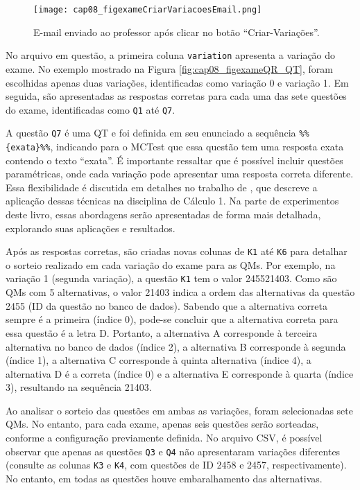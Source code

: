 \begin{figure}[!ht]
  \centering
  \texttt{[image: cap08\_figexameCriarVariacoesEmail.png]}
   \caption{E-mail enviado ao professor após clicar no botão ``Criar-Variações''.}
\label{fig:cap08_figexameCriarVariacoesEmail}
\end{figure}


No arquivo em questão, a primeira coluna \verb|variation| apresenta a variação do exame. No exemplo mostrado na Figura \ref{fig:cap08_figexameQR_QT}, foram escolhidas apenas duas variações, identificadas como variação 0 e variação 1. Em seguida, são apresentadas as respostas corretas para cada uma das sete questões do exame, identificadas como \verb|Q1| até \verb|Q7|.

A questão \verb|Q7| é uma QT e foi definida em seu enunciado a sequência \verb|%%{exata}%%|, indicando para o MCTest que essa questão tem uma resposta exata contendo o texto ``exata''. É importante ressaltar que é possível incluir questões paramétricas, onde cada variação pode apresentar uma resposta correta diferente. Essa flexibilidade é discutida em detalhes no trabalho de , que descreve a aplicação dessas técnicas na disciplina de Cálculo 1. Na parte de experimentos deste livro, essas abordagens serão apresentadas de forma mais detalhada, explorando suas aplicações e resultados.

Após as respostas corretas, são criadas novas colunas de \verb|K1| até \verb|K6| para detalhar o sorteio realizado em cada variação do exame para as QMs. Por exemplo, na variação 1 (segunda variação), a questão \verb|K1| tem o valor 245521403. Como são QMs com 5 alternativas, o valor 21403 indica a ordem das alternativas da questão 2455 (ID da questão no banco de dados). Sabendo que a alternativa correta sempre é a primeira (índice 0), pode-se concluir que a alternativa correta para essa questão é a letra D. Portanto, a alternativa A corresponde à terceira alternativa no banco de dados (índice 2), a alternativa B corresponde à segunda (índice 1), a alternativa C corresponde à quinta alternativa (índice 4), a alternativa D é a correta (índice 0) e a alternativa E corresponde à quarta (índice 3), resultando na sequência 21403. 

Ao analisar o sorteio das questões em ambas as variações, foram selecionadas sete QMs. No entanto, para cada exame, apenas seis questões serão sorteadas, conforme a configuração previamente definida. No arquivo CSV, é possível observar que apenas as questões \verb|Q3| e \verb|Q4| não apresentaram variações diferentes (consulte as colunas \verb|K3| e \verb|K4|, com questões de ID 2458 e 2457, respectivamente). No entanto, em todas as questões houve embaralhamento das alternativas.

